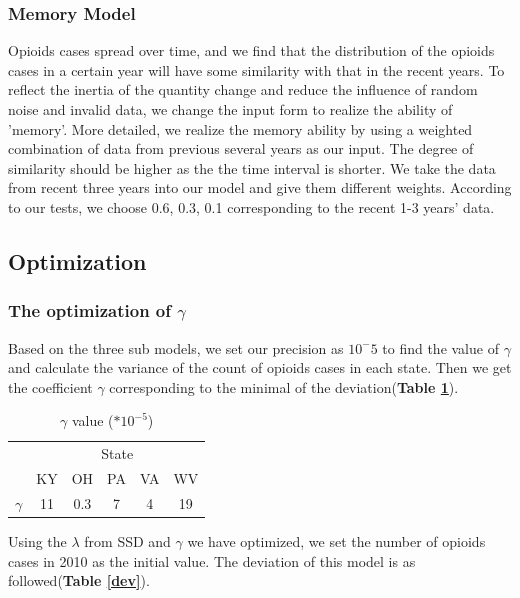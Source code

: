 \documentclass[12pt]{article}
\begin{document}
\subsubsection{Memory Model}
Opioids cases spread over time, and we find that the distribution of the opioids cases in a certain year will have some similarity with that in the recent years. To reflect the inertia of the quantity change and reduce the influence of random noise and invalid data, we change the input form to realize the ability of 'memory'. More detailed, we realize the memory ability by using a weighted combination of data from previous several years as our input. The degree of similarity should be higher as the the time interval is shorter. We take the data from recent three years into our model and give them different weights. According to our tests, we choose 0.6, 0.3, 0.1 corresponding to the recent 1-3 years' data.

\subsection{Optimization}
\subsubsection{The optimization of $\gamma$}
Based on the three sub models, we set our precision as $10^-5$ to find the value of $\gamma$ and calculate the variance of the count of opioids cases in each state. Then we get the coefficient $\gamma$ corresponding to the minimal of the deviation(\textbf{Table \ref{gamma}}).

\begin{table}[h]
\centering
\begin{tabular}{cccccc}
  \toprule
   & \multicolumn{5}{c}{State} \\
  \cmidrule{2-6}
& KY & OH & PA & VA & WV  \\
  \midrule
  $\gamma$ & 11 & 0.3 & 7 & 4& 19  \\
  \bottomrule
\end{tabular}
\caption{$\gamma$ value ($*10^{-5}$)}
\label{gamma}
\end{table}

Using the $\lambda$ from SSD and $\gamma$ we have optimized, we set the number of opioids cases in 2010 as the initial value. The deviation of this model is as followed(\textbf{Table \ref{dev}}). 
\end{document}
